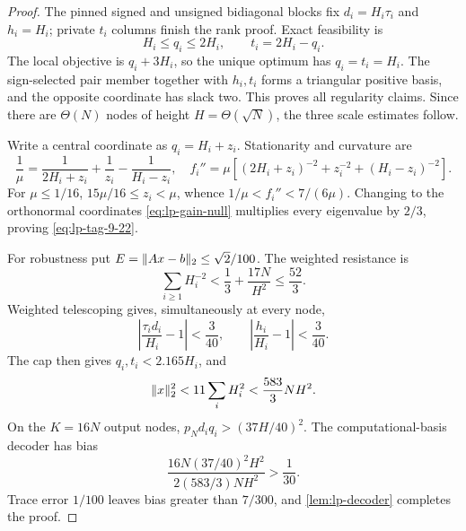 \begin{proof}
The pinned signed and unsigned bidiagonal blocks fix
\(d_i=H_i\tau_i\) and \(h_i=H_i\); private \(t_i\) columns finish the rank
proof.  Exact feasibility is
\begin{equation}
 H_i\leq q_i\leq2H_i,\qquad t_i=2H_i-q_i.
\end{equation}
The local objective is \(q_i+3H_i\), so the unique optimum has
\(q_i=t_i=H_i\).  The sign-selected pair member together with \(h_i,t_i\)
forms a triangular positive basis, and the opposite coordinate has slack two.
This proves all regularity claims.  Since there are \(\Theta(N)\) nodes of
height \(H=\Theta(\sqrt N)\), the three scale estimates follow.

Write a central coordinate as \(q_i=H_i+z_i\).  Stationarity and curvature
are
\begin{equation}
 \frac1\mu=\frac1{2H_i+z_i}+\frac1{z_i}-\frac1{H_i-z_i},
\quad
 f_i''=\mu\left[(2H_i+z_i)^{-2}+z_i^{-2}+(H_i-z_i)^{-2}\right].
\end{equation}
For \(\mu\leq1/16\),
\(15\mu/16\leq z_i<\mu\), whence
\(1/\mu<f_i''<7/(6\mu)\).  Changing to the orthonormal coordinates
\eqref{eq:lp-gain-null} multiplies every eigenvalue by \(2/3\), proving
\eqref{eq:lp-tag-9-22}.

For robustness put \(E=\lVert Ax-b\rVert_2\leq\sqrt2/100\).  The weighted
resistance is
\[
 \sum_{i\geq1}H_i^{-2}<\frac13+\frac{17N}{H^2}\leq\frac{52}{3}.
\]
Weighted telescoping gives, simultaneously at every node,
\begin{equation}
 \left|\frac{\tau_id_i}{H_i}-1\right|<\frac3{40},
 \qquad \left|\frac{h_i}{H_i}-1\right|<\frac3{40}.
\end{equation}
The cap then gives \(q_i,t_i<2.165H_i\), and
\begin{equation}
 \lVert x\rVert_2^2<11\sum_iH_i^2
 <\frac{583}{3}NH^2.
\end{equation}
On the \(K=16N\) output nodes,
\(p_Nd_iq_i>(37H/40)^2\).  The computational-basis decoder has bias
\begin{equation}
 \frac{16N(37/40)^2H^2}{2(583/3)NH^2}>\frac1{30}.
\end{equation}
Trace error \(1/100\) leaves bias greater than \(7/300\), and
\cref{lem:lp-decoder} completes the proof.
\end{proof}

